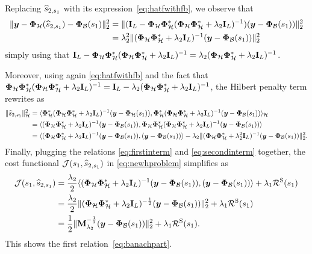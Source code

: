     Replacing $\widehat{s}_{2, s_1}$ with its expression~\eqref{eq:hatfwithfb}, we observe that
    \begin{align}
        \| \bm{y} - \bm{\Phi}_\mathcal{H}( \widehat{s}_{2, s_1} ) - \bm{\Phi}_\mathcal{B} (s_1) \|_2^2 &= 
        \| (\mathbf{I}_L - \bm{\Phi}_\mathcal{H} \bm{\Phi}_\mathcal{H}^*( \bm{\Phi}_\mathcal{H} \bm{\Phi}_\mathcal{H}^* + \lambda_{2} \mathbf{I}_L)^{-1}) ( \bm{y} - \bm{\Phi}_\mathcal{B} (s_1) ) \|_2^2 \nonumber  \\
        &= \lambda_{2}^2 \| ( \bm{\Phi}_\mathcal{H}\bm{\Phi}_\mathcal{H}^* + \lambda_{2} \mathbf{I}_L)^{-1} (\bm{y} - \bm{\Phi}_\mathcal{B}(s_1) ) \|_2^2 \label{eq:firstinterm}
    \end{align}
    simply using that $\mathbf{I}_L - \bm{\Phi}_\mathcal{H}\bm{\Phi}_\mathcal{H}^*( \bm{\Phi}_\mathcal{H}\bm{\Phi}_\mathcal{H}^* + \lambda_{2} \mathbf{I}_L)^{-1} = \lambda_{2} ( \bm{\Phi}_\mathcal{H}\bm{\Phi}_\mathcal{H}^* + \lambda_{2} \mathbf{I}_L)^{-1}$. 

    Moreover, using again \eqref{eq:hatfwithfb} and the fact that $\bm{\Phi}_\mathcal{H}\bm{\Phi}_\mathcal{H}^* ( \bm{\Phi}_\mathcal{H}\bm{\Phi}_\mathcal{H}^* + \lambda_{2} \mathbf{I}_L)^{-1} = \mathbf{I}_L - \lambda_{2} ( \bm{\Phi}_\mathcal{H}\bm{\Phi}_\mathcal{H}^* + \lambda_{2} \mathbf{I}_L)^{-1}$, the Hilbert penalty term rewrites as
    \begin{align}
        \|  \widehat{s}_{2, s_1}\|_{\mathcal{H}}^2 
        &=
        \langle \bm{\Phi}_\mathcal{H}^* ( \bm{\Phi}_\mathcal{H}\bm{\Phi}_\mathcal{H}^* + \lambda_{2} \mathbf{I}_L)^{-1} ( \bm{y} - \bm{\Phi}_\mathcal{H}(s_1) ) , \bm{\Phi}_\mathcal{H}^* ( \bm{\Phi}_\mathcal{H}\bm{\Phi}_\mathcal{H}^* + \lambda_{2} \mathbf{I}_L)^{-1} ( \bm{y} -  \bm{\Phi}_\mathcal{B} (s_1) ) \rangle_{\mathcal{H}} \nonumber \\
        &=
        \langle ( \bm{\Phi}_\mathcal{H}\bm{\Phi}_\mathcal{H}^* + \lambda_{2} \mathbf{I}_L)^{-1} ( \bm{y} - \bm{\Phi}_\mathcal{B}(s_1) ) ,  \bm{\Phi}_\mathcal{H} \bm{\Phi}_\mathcal{H}^* ( \bm{\Phi}_\mathcal{H} \bm{\Phi}_\mathcal{H}^* + \lambda_{2} \mathbf{I}_L)^{-1} ( \bm{y} - \bm{\Phi}_\mathcal{B}(s_1) ) \rangle \nonumber \\
        &= 
        \langle ( \bm{\Phi}_\mathcal{H} \bm{\Phi}_\mathcal{H}^* + \lambda_{2} \mathbf{I}_L)^{-1} ( \bm{y} - \bm{\Phi}_\mathcal{B}(s_1) ) ,  ( \bm{y} - \bm{\Phi}_\mathcal{B}(s_1) ) \rangle - \lambda_{2} \|( \bm{\Phi}_\mathcal{H} \bm{\Phi}_\mathcal{H}^* + \lambda_{2}^2 \mathbf{I}_L)^{-1} ( \bm{y} - \bm{\Phi}_\mathcal{B}(s_1) ) \|_2^2.   \label{eq:secondinterm} 
    \end{align}
    Finally, plugging the relations \eqref{eq:firstinterm} and \eqref{eq:secondinterm} together,  the cost functional $\mathcal{J}(s_1, \widehat{s}_{2, s_1})$ in \eqref{eq:newhproblem} simplifies as
    \begin{align*}
        \mathcal{J}(s_1, \widehat{s}_{2, s_1}) &=  \frac{\lambda_{2}}{2} \langle ( \bm{\Phi}_\mathcal{H} \bm{\Phi}_\mathcal{H}^* + \lambda_{2} \mathbf{I}_L)^{-1} ( \bm{y} - \bm{\Phi}_\mathcal{B}(s_1) ) ,  ( \bm{y} - \bm{\Phi}_\mathcal{B}(s_1) ) \rangle + \lambda_{1} \mathcal{R}^\mathrm{S}(s_1) \nonumber \\
        &= \frac{\lambda_{2}}{2} \| ( \bm{\Phi}_\mathcal{H} \bm{\Phi}_\mathcal{H}^* + \lambda_{2} \mathbf{I}_L)^{-\frac{1}{2}} (\bm{y} - \bm{\Phi}_\mathcal{B}(s_1) ) \|_2^2 + \lambda_{1} \mathcal{R}^\mathrm{S}(s_1) \\
        &= \frac{1}{2}\| \mathbf{M}_{\lambda_{2}}^{-\frac{1}{2}} (\bm{y} - \bm{\Phi}_\mathcal{B}(s_1) ) \|_2^2 + \lambda_{1} \mathcal{R}^\mathrm{S}(s_1).
    \end{align*}
    This shows the first relation~\eqref{eq:banachpart}.

